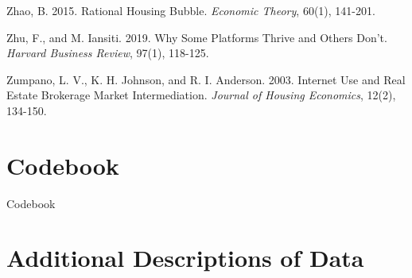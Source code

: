 \documentclass[11pt]{article}
\begin{document}
\begin{singlespace}
\begin{thebibliography}{}
Zhao, B. 2015. Rational Housing Bubble. \textit{Economic Theory}, 60(1), 141-201. 

Zhu, F., and M. Iansiti. 2019. Why Some Platforms Thrive and Others Don't. \textit{Harvard Business Review}, 97(1), 118-125. 

Zumpano, L. V., K. H. Johnson, and R. I. Anderson. 2003. Internet Use and Real Estate Brokerage Market Intermediation. \textit{Journal of Housing Economics}, 12(2), 134-150. 


  \end{thebibliography}
\end{singlespace}



\newpage
\appendix
\setcounter{table}{0}
\renewcommand{\tablename}{Appendix Table}
\renewcommand{\figurename}{Appendix Figure}
\renewcommand{\thetable}{\thesection. \arabic{table}}
\setcounter{figure}{0}
\renewcommand{\thefigure}{\thesection. \arabic{figure}}

\section{Codebook} \label{sec:codebook}

\begin{table}[H]
  \begin{center}
    \begin{scriptsize}
    \caption{Codebook}
    \label{tab:codebook}
      
  
    \end{scriptsize}
  \end{center}
\end{table}


\section{Additional Descriptions of Data} \label{sec:appendix_data}
\end{document}
